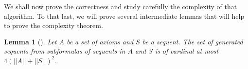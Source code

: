 \documentclass[a4paper, 11pt]{article}
\newtheorem{lemma}[theorem]{Lemma}
\begin{document}
    We shall now prove the correctness and study carefully the complexity of that algorithm. To that
    last, we will prove several intermediate lemmas that will help to prove the complexity theorem.
    \begin{lemma}[\cite{10.1145/3632881}]\label{lemma_sequents_cardinal} 
	    Let $A$ be a set of axioms and $S$ be a sequent. The set of generated sequents from
	    subformulas of sequents in $A$ and $S$ is of cardinal at most $4(||A||+||S||)^2$.
    \end{lemma}
\end{document}
